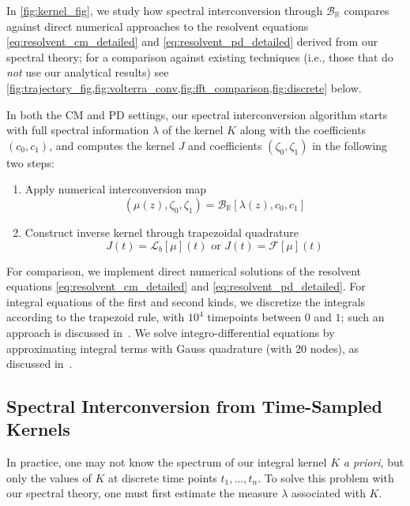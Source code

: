 \documentclass{cams-l} %
\newcommand{\dave}[1]{#1}\newcommand{\davebegin}{}\newcommand{\daveend}{}\newcommand{\george}[1]{#1}
\newcommand{\RR}{\mathbb R}
\newcommand{\cL}{\mathcal L}
\newcommand{\cB}{\mathcal B}
\newcommand{\cF}{\mathcal F}
\theoremstyle{definition}
\theoremstyle{remark}
\numberwithin{equation}{section}
\begin{document}
\dave{In \cref{fig:kernel_fig}, we study how spectral interconversion through $\cB_\RR$ compares against direct numerical approaches to the resolvent equations \cref{eq:resolvent_cm_detailed} and \cref{eq:resolvent_pd_detailed} derived from our spectral theory; for a comparison against existing techniques (i.e., those that do \emph{not} use our analytical results) see \cref{fig:trajectory_fig,fig:volterra_conv,fig:fft_comparison,fig:discrete} below.}

\dave{In both the CM and PD settings, our spectral interconversion algorithm starts with full spectral information $\lambda$ of the kernel $K$ along with the coefficients $(c_0, c_1)$, and computes the kernel $J$ and coefficients $(\zeta_0, \zeta_1)$ in the following two steps:
\begin{enumerate}
\item Apply numerical interconversion map
$$(\mu(z), \zeta_0, \zeta_1) = \cB_\RR[\lambda(z), c_0, c_1]$$
\item Construct inverse kernel through trapezoidal quadrature
$$J(t) = \cL_b[\mu](t) \text{ or } J(t) = \cF[\mu](t)$$
\end{enumerate}}

\dave{For comparison, we implement direct numerical solutions of the resolvent equations \cref{eq:resolvent_cm_detailed} and \cref{eq:resolvent_pd_detailed}. For integral equations of the first and second kinds, we discretize the integrals according to the trapezoid rule, with $10^4$ timepoints between $0$ and $1$; such an approach is discussed in~\cite[Ch.~18.2]{teukolsky1992numerical}. We solve integro-differential equations by approximating integral terms with Gauss quadrature (with 20 nodes), as discussed in~\cite{ansmann2018efficiently}. }



\subsection{Spectral Interconversion from Time-Sampled Kernels}\label{subsec:invlaplace}
In practice, one may not know the spectrum of our integral kernel $K$ \emph{a priori}, but only the values of $K$ at discrete time points $t_1,...,t_n$. To solve this problem with our spectral theory, one must first estimate the \dave{measure $\lambda$ associated with $K$}.
\end{document}
